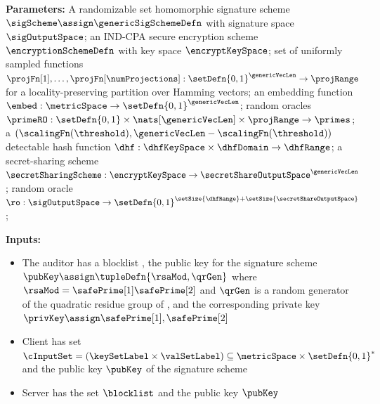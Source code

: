 \begin{mdframed}[frametitle={Delegated Fuzzy PSI}, frametitlealignment=\centering, 
	font=\small]
	
	\smallskip\noindent\textbf{Parameters:} A randomizable set homomorphic signature scheme 
	$\sigScheme \assign \genericSigSchemeDefn$ with signature space $\sigOutputSpace$; an 
	IND-CPA secure encryption scheme $\encryptionSchemeDefn$ with key space 
	$\encryptKeySpace$; set of uniformly sampled functions $\projFn[1], \dots, 
	\projFn[\numProjections]: \setDefn{0,1}^{\genericVecLen} \rightarrow \projRange$ for a 
	locality-preserving partition over Hamming vectors; an embedding function 
	$\embed: \metricSpace \rightarrow \setDefn{0,1}^{\genericVecLen}$; 
	random oracles $\primeRO: 
	\setDefn{0,1} \times \nats[\genericVecLen] \times \projRange \rightarrow \primes$;  
	a $(\scalingFn(\threshold), \genericVecLen - \scalingFn(\threshold))$ detectable hash 
	function $\dhf: \dhfKeySpace \times \dhfDomain \rightarrow \dhfRange$;
	a secret-sharing scheme $\secretSharingScheme: \encryptKeySpace \rightarrow 
	\secretShareOutputSpace^{\genericVecLen}$; random oracle $\ro: 
	\sigOutputSpace \rightarrow \setDefn{0,1}^{\setSize{\dhfRange} + 
		\setSize{\secretShareOutputSpace}}$;
	
	\smallskip\noindent\textbf{Inputs:}
	\begin{itemize}[leftmargin=0.5em]
		\item The auditor \auditor has a blocklist \blocklist, the public key for the signature scheme 
		$\pubKey \assign \tupleDefn{\rsaMod, \qrGen}$ where $\rsaMod = \safePrime[1] \safePrime[2]$ 
		and $\qrGen$ is a random generator of the quadratic residue group \qrGroup of 
		\integersModNInv , and the corresponding private key $\privKey \assign \safePrime[1], 
		\safePrime[2]$  
		\item 	Client has set $\cInputSet = (\keySetLabel \times \valSetLabel) \subseteq \metricSpace 
		\times \setDefn{0,1}^{\ast}$ and the public key $\pubKey$ of the signature scheme
		\item Server has the set $\blocklist$ and the public key $\pubKey$ 	
	\end{itemize}
	

\end{mdframed}
